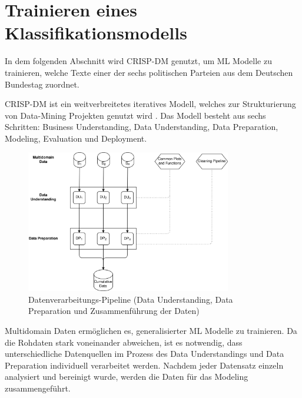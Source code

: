 
\chapter{Trainieren eines Klassifikationsmodells} \label{ch:crispDm_1}

In dem folgenden Abschnitt wird \ac{CRISP-DM} genutzt, um \ac{ML} Modelle zu trainieren, welche Texte einer der sechs politischen Parteien aus dem Deutschen Bundestag zuordnet. 


\ac{CRISP-DM} ist ein weitverbreitetes iteratives Modell, welches zur Strukturierung von Data-Mining Projekten genutzt wird \autocite{martinez-plumed_casp-dm_2017, chapman_crisp-dm_2000}. Das Modell besteht aus sechs Schritten: Business Understanding, Data Understanding, Data Preparation, Modeling, Evaluation und Deployment. 

\begin{figure}[H]
    \centering
    \includegraphics[width=0.8\textwidth]{data/images/data_flow_v2_1.png}
    \caption[Datenverarbeitungs-Pipeline]{Datenverarbeitungs-Pipeline (Data Understanding, Data Preparation und Zusammenführung der Daten)} \label{fig:dataFlow_1}
\end{figure}


Multidomain Daten ermöglichen es, generalisierter \ac{ML} Modelle zu trainieren. Da die Rohdaten stark voneinander abweichen, ist es notwendig, dass unterschiedliche Datenquellen im Prozess des Data Understandings und Data Preparation individuell verarbeitet werden. Nachdem jeder Datensatz einzeln analysiert und bereinigt wurde, werden die Daten für das Modeling zusammengeführt.

